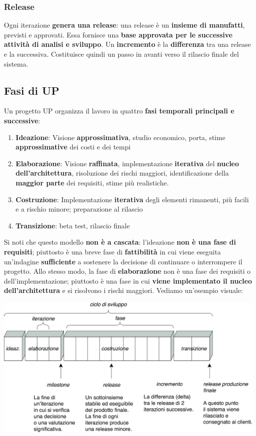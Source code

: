 \documentclass[12pt]{article}
\begin{document}
\subsubsection{Release}
Ogni iterazione \textbf{genera una release}: una release è un \textbf{insieme di manufatti}, previsti e approvati. Essa fornisce una \textbf{base approvata per le successive attività di analisi e sviluppo}.
Un \textbf{incremento} è la \textbf{differenza} tra una release e la successiva. Costituisce quindi un passo in avanti verso il rilascio finale del sistema.
\newpage
\subsection{Fasi di UP}
Un progetto UP organizza il lavoro in quattro \textbf{fasi temporali principali e successive}:
\begin{enumerate}
    \item \textbf{Ideazione}: Visione \textbf{approssimativa}, studio economico, porta, stime \textbf{approssimative} dei costi e dei tempi
    \item \textbf{Elaborazione}: Visione \textbf{raffinata}, implementazione \textbf{iterativa} del \textbf{nucleo dell'architettura}, risoluzione dei rischi maggiori, identificazione della \textbf{maggior parte} dei requisiti, stime più realistiche.
    \item \textbf{Costruzione}: Implementazione \textbf{iterativa} degli elementi rimanenti, più facili e a rischio minore; preparazione al rilascio
    \item \textbf{Transizione}: beta test, rilascio finale
\end{enumerate}
Si noti che questo modello \textbf{non è a cascata}: l'ideazione \textbf{non è una fase di requisiti}; piuttosto è una breve fase di \textbf{fattibilità} in cui viene eseguita un'indagine \textbf{sufficiente} a sostenere la decisione di continuare o interrompere il progetto.
Allo stesso modo, la fase di \textbf{elaborazione} non è una fase dei requisiti o dell'implementazione; piuttosto è una fase in cui \textbf{viene implementato il nucleo dell'architettura} e si risolvono i rischi maggiori.
Vediamo un'esempio visuale:
\begin{center}
    \includegraphics[width = 1\textwidth]{Images/20.png}
\end{center}
\end{document}
